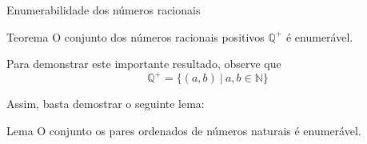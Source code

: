 \begin{frame}[fragile]{Enumerabilidade dos números racionais}

    \begin{block}{Teorema}
        O conjunto dos números racionais positivos $\mathbb{Q}^+$ é enumerável.
    \end{block}

    \vspace{0.2in}

    Para demonstrar este importante resultado, observe que
    \[
        \mathbb{Q}^+ = \lbrace (a, b)\ |\ a, b\in \mathbb{N}\rbrace
    \]

    Assim, basta demostrar o seguinte lema:

    \begin{block}{Lema}
        O conjunto os pares ordenados de números naturais é enumerável.
    \end{block}

\end{frame}

